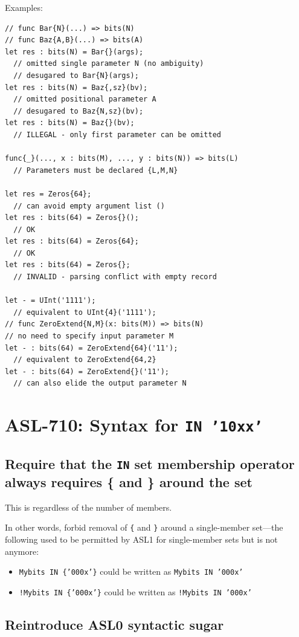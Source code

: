 \noindent
Examples:
\begin{verbatim}
// func Bar{N}(...) => bits(N)
// func Baz{A,B}(...) => bits(A)
let res : bits(N) = Bar{}(args);
  // omitted single parameter N (no ambiguity)
  // desugared to Bar{N}(args);
let res : bits(N) = Baz{,sz}(bv);
  // omitted positional parameter A
  // desugared to Baz{N,sz}(bv);
let res : bits(N) = Baz{}(bv);
  // ILLEGAL - only first parameter can be omitted

func{_}(..., x : bits(M), ..., y : bits(N)) => bits(L)
  // Parameters must be declared {L,M,N}

let res = Zeros{64};
  // can avoid empty argument list ()
let res : bits(64) = Zeros{}();
  // OK
let res : bits(64) = Zeros{64};
  // OK
let res : bits(64) = Zeros{};
  // INVALID - parsing conflict with empty record

let - = UInt('1111');
  // equivalent to UInt{4}('1111');
// func ZeroExtend{N,M}(x: bits(M)) => bits(N)
// no need to specify input parameter M
let - : bits(64) = ZeroExtend{64}('11');
  // equivalent to ZeroExtend{64,2}
let - : bits(64) = ZeroExtend{}('11');
  // can also elide the output parameter N
\end{verbatim}

\section{ASL-710: Syntax for \texttt{IN '10xx'}}

\subsection{Require that the \texttt{IN} set membership operator always
requires \{ and \} around the set}

This is regardless of the number of members.

In other words, forbid removal of \texttt{\{} and \texttt{\}} around a
single-member set---the following used to be permitted by ASL1 for
single-member sets but is not anymore:

\begin{itemize}
\item \texttt{Mybits IN \{'000x'\}} could be written as \texttt{Mybits IN '000x'}
\item \texttt{!Mybits IN \{'000x'\}} could be written as \texttt{!Mybits
IN '000x'}
\end{itemize}

\subsection{Reintroduce ASL0 syntactic sugar}

